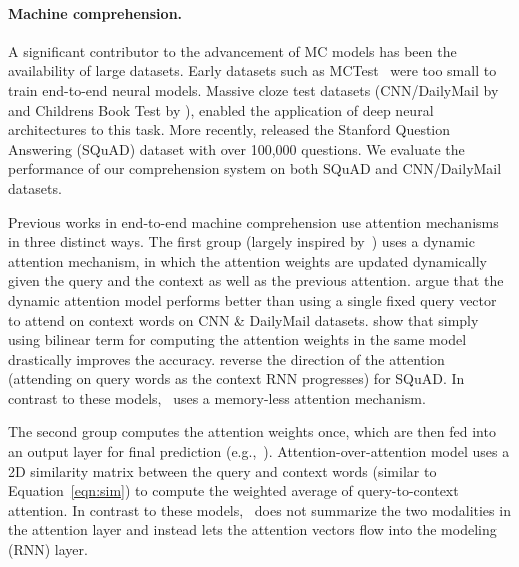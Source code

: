 \paragraph{Machine comprehension.}
A significant contributor to the advancement of MC models has been the availability of large datasets. Early datasets such as MCTest~\citep{richardson2013mctest} were too small to train end-to-end neural models. 
Massive cloze test datasets (CNN/DailyMail by \citet{Hermann2015TeachingMT} and Childrens Book Test by \cite{hill2015goldilocks}), enabled the application of deep neural architectures to this task. 
More recently, \citet{rajpurkar2016squad} released the Stanford Question Answering (SQuAD) dataset with over 100,000 questions. We evaluate the performance of our comprehension system on both SQuAD and CNN/DailyMail datasets. 

Previous works in end-to-end machine comprehension use attention mechanisms in three distinct ways. 
The first group (largely inspired by~\cite{Bahdanau2014NeuralMT}) uses a dynamic attention mechanism, in which the attention weights are updated dynamically given the query and the context as well as the previous attention. 
\cite{Hermann2015TeachingMT} argue that the dynamic attention model performs better than using a single fixed query vector to attend on context words on CNN \& DailyMail datasets.
\cite{thorough} show that simply using bilinear term for computing the attention weights in the same model drastically improves the accuracy.
\cite{wang2016machine} reverse the direction of the attention (attending on query words as the context RNN progresses) for SQuAD. In contrast to these models, \sysshort\ uses a memory-less attention mechanism. 

The second group computes the attention weights once, which are then fed into an output layer for final prediction (e.g.,~\cite{kadlec2016text}).
Attention-over-attention model \citep{aoa} uses a 2D similarity matrix between the query and context words (similar to Equation~\ref{eqn:sim}) to compute the weighted average of query-to-context attention. In contrast to these models, \sysshort\ does not summarize the two modalities in the attention layer and instead lets the attention vectors flow into the modeling (RNN) layer. %

